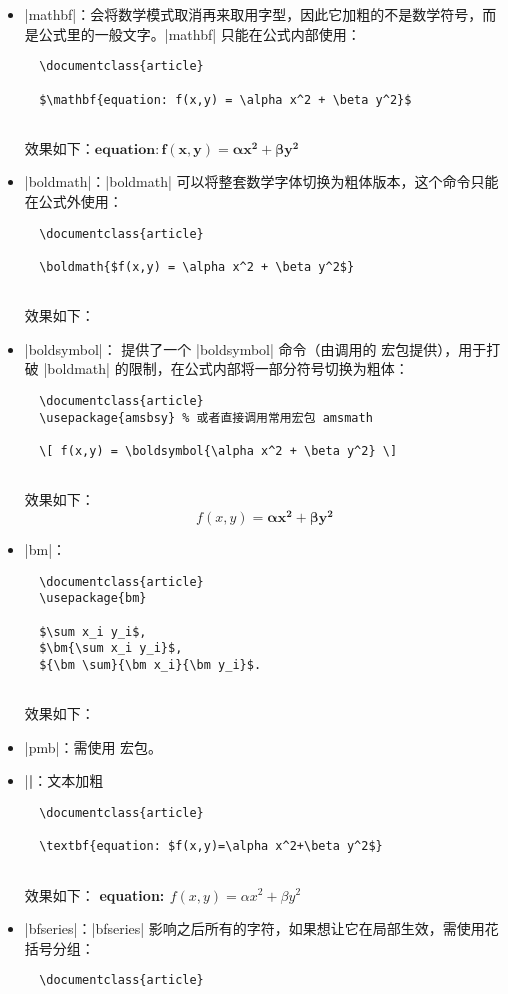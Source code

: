 \begin{itemize}
  \item |mathbf|：会将数学模式取消再来取用字型，因此它加粗的不是数学符号，而是公式里的一般文字。|mathbf| 只能在公式内部使用： 
  \begin{verbatim}
  \documentclass{article}
  
  $\mathbf{equation: f(x,y) = \alpha x^2 + \beta y^2}$
  
  \end{verbatim}
  效果如下：$ \mathbf{equation: f(x,y) = \alpha x^2 + \beta y^2} $
  \item |boldmath|：|boldmath| 可以将整套数学字体切换为粗体版本，这个命令只能在公式外使用：
  \begin{verbatim}
  \documentclass{article}
  
  \boldmath{$f(x,y) = \alpha x^2 + \beta y^2$}
  
  \end{verbatim}
  效果如下：
  \item |boldsymbol|： 提供了一个 |boldsymbol| 命令（由调用的  宏包提供），用于打破 |boldmath| 的限制，在公式内部将一部分符号切换为粗体：
  \begin{verbatim}
  \documentclass{article}
  \usepackage{amsbsy} % 或者直接调用常用宏包 amsmath
  
  \[ f(x,y) = \boldsymbol{\alpha x^2 + \beta y^2} \]
  
  \end{verbatim}
  效果如下：
  \[ f(x,y) = \boldsymbol{\alpha x^2 + \beta y^2} \]
  \item |bm|：
  \begin{verbatim}
  \documentclass{article}
  \usepackage{bm}
  
  $\sum x_i y_i$,
  $\bm{\sum x_i y_i}$,
  ${\bm \sum}{\bm x_i}{\bm y_i}$.
  
  \end{verbatim}
  效果如下：
  \item |pmb|：需使用  宏包。
  \item |\textbf|：文本加粗
  \begin{verbatim}
  \documentclass{article}
  
  \textbf{equation: $f(x,y)=\alpha x^2+\beta y^2$}
  
  \end{verbatim}
  效果如下：
  \textbf{equation: $f(x,y)=\alpha x^2+\beta y^2$}
  \item |bfseries|：|bfseries| 影响之后所有的字符，如果想让它在局部生效，需使用花括号分组：
  \begin{verbatim}
  \documentclass{article}
  

\end{verbatim}
\end{itemize}
